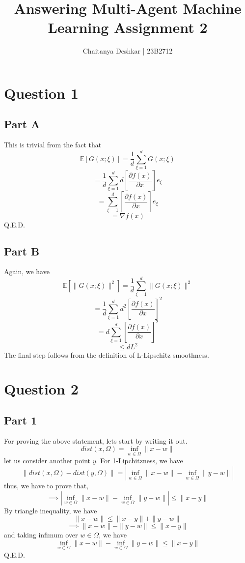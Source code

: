 \documentclass{article}
\title{Answering Multi-Agent Machine Learning Assignment 2}
\author{Chaitanya Deshkar | 23B2712}
\begin{document}
\maketitle

\section*{Question 1}
\subsection*{Part A}
This is trivial from the fact that \[\mathbb{E}[G(x;\xi)] = \frac{1}{d} \sum_{\xi = 1}^d G(x;\xi)\]
\[= \frac{1}{d} \sum_{\xi = 1}^d d\left[\frac{\partial f(x)}{\partial x}\right]e_\xi\]
\[= \sum_{\xi = 1}^d \left[\frac{\partial f(x)}{\partial x}\right]e_\xi\]
\[= \nabla f(x)\]
Q.E.D.
\subsection*{Part B}
Again, we have \[\mathbb{E}[\|G(x;\xi)\|^2] = \frac{1}{d} \sum_{\xi = 1}^d \|G(x;\xi)\|^2\]
\[= \frac{1}{d} \sum_{\xi = 1}^d d^2 \left[\frac{\partial f(x)}{\partial x}\right]^2\]
\[= d \sum_{\xi = 1}^d \left[\frac{\partial f(x)}{\partial x}\right]^2\]
\[\le dL^2\]
The final step follows from the definition of L-Lipschitz smoothness.

\section*{Question 2}
\subsection*{Part 1}
For proving the above statement, lets start by writing it out. 
\[dist(x, \Omega) = \inf_{w \in \Omega} \|x - w\|\]
let us consider another point $y$. For 1-Lipchitzness, we have
\[\|dist(x, \Omega) - dist(y, \Omega)\| = |\inf_{w \in \Omega} \|x - w\| - \inf_{w \in \Omega} \|y - w\||\]
thus, we have to prove that,
\[\implies |\inf_{w \in \Omega} \|x - w\| - \inf_{w \in \Omega} \|y - w\|| \le \|x - y\|\]
By triangle inequality, we have
\[\|x - w\| \le \|x - y\| + \|y - w\|\]
\[\implies \|x - w\| - \|y - w\| \le \|x - y\|\]
and taking infimum over $w \in \Omega$, we have
\[\inf_{w \in \Omega} \|x - w\| - \inf_{w \in \Omega} \|y - w\| \le \|x - y\|\]
Q.E.D.
\end{document}
